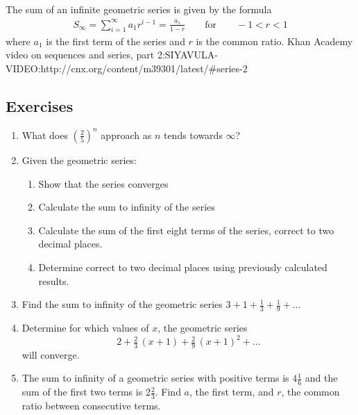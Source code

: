 The sum of an infinite geometric series is given by the formula
\begin{eqnarray}
\label{eq:mp:se:ig:4}
\boxed{S_\infty = \sum_{i=1}^\infty a_1r^{i-1} = \frac {a_1}{1-r} \qquad \mathrm{ for } \qquad -1<r<1 }
\end{eqnarray}
where $a_1$ is the first term of the series and $r$ is the common ratio.
Khan Academy video on sequences and series, part 2:SIYAVULA-VIDEO:http://cnx.org/content/m39301/latest/#series-2

\subsection{Exercises}
\begin{enumerate}
\item What does $(\tfrac{2}{5})^n$ approach as $n$ tends towards $\infty$?
\item{Given the geometric series:
\begin{enumerate}
\item Show that the series converges
\item Calculate the sum to infinity of the series
\item Calculate the sum of the first eight terms of the series, correct to two decimal places.
\item Determine
correct to two decimal places using previously calculated results.
\end{enumerate}}
\item Find the sum to infinity of the geometric series $3 + 1 + \tfrac{1}{3} + \tfrac{1}{9} + \ldots$
\item Determine for which values of $x$, the geometric series $$2 + \tfrac{2}{3} \, (x+1) +\tfrac{2}{9} \, (x+1)^2 + \ldots$$ will converge.
\item The sum to infinity of a geometric series with positive terms is $4\tfrac{1}{6}$ and the sum of the first two terms is $2\tfrac{2}{3}$. Find $a$, the first term, and $r$, the common ratio between consecutive terms.
\end{enumerate}


